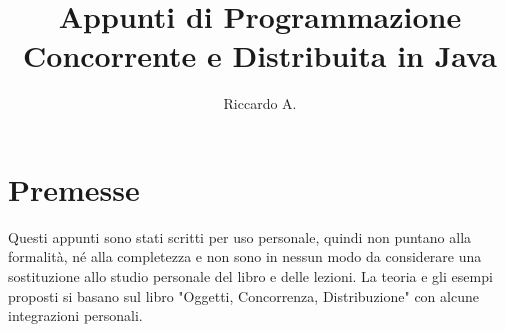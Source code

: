 

\author{Riccardo A.}
\title{Appunti di Programmazione Concorrente e Distribuita in Java}
\date{}



\maketitle

\section*{Premesse}
Questi appunti sono stati scritti per uso personale, quindi non puntano alla formalità, né alla completezza e non sono in nessun modo da considerare una sostituzione allo studio personale del libro e delle lezioni. La teoria e gli esempi proposti si basano sul libro "Oggetti, Concorrenza, Distribuzione" con alcune integrazioni personali.

\tableofcontents





